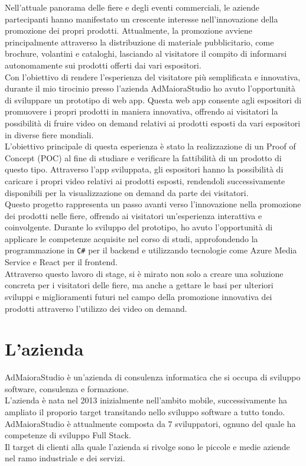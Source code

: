 Nell'attuale panorama delle fiere e degli eventi commerciali, le aziende partecipanti hanno manifestato un crescente interesse nell'innovazione della promozione 
dei propri prodotti. Attualmente, la promozione avviene principalmente attraverso la distribuzione di materiale pubblicitario, come brochure, volantini e cataloghi, 
lasciando al visitatore il compito di informarsi autonomamente sui prodotti offerti dai vari espositori.\\
Con l'obiettivo di rendere l'esperienza del visitatore più semplificata e innovativa, durante il mio tirocinio presso l'azienda AdMaioraStudio ho avuto 
l'opportunità di sviluppare un prototipo di web app. Questa web app consente agli espositori di promuovere i propri prodotti in maniera innovativa, 
offrendo ai visitatori la possibilità di fruire video on demand relativi ai prodotti esposti da vari espositori in diverse fiere mondiali.\\
L'obiettivo principale di questa esperienza è stato la realizzazione di un Proof of Concept (POC) al fine di studiare e verificare la fattibilità di 
un prodotto di questo tipo. Attraverso l'app sviluppata, gli espositori hanno la possibilità di caricare i propri video relativi ai prodotti esposti, 
rendendoli successivamente disponibili per la visualizzazione on demand da parte dei visitatori.\\
Questo progetto rappresenta un passo avanti verso l'innovazione nella promozione dei prodotti nelle fiere, offrendo ai visitatori un'esperienza interattiva 
e coinvolgente. Durante lo sviluppo del prototipo, ho avuto l'opportunità di applicare le competenze acquisite nel corso di studi, 
approfondendo la programmazione in \lstinline[language={[Sharp]C}]|C#| per il backend e utilizzando tecnologie come Azure Media Service e React per il frontend.\\
Attraverso questo lavoro di stage, si è mirato non solo a creare una soluzione concreta per i visitatori delle fiere, ma anche a gettare le basi per ulteriori 
sviluppi e miglioramenti futuri nel campo della promozione innovativa dei prodotti attraverso l'utilizzo dei video on demand.\\


\section{L'azienda}

AdMaioraStudio è un'azienda di consulenza informatica che si occupa di sviluppo software, consulenza e formazione.\\
L'azienda è nata nel 2013 inizialmente nell'ambito mobile, successivamente ha ampliato il proporio target transitando nello sviluppo software a tutto tondo.\\
AdMaioraStudio è attualmente composta da 7 sviluppatori, ognuno del quale ha competenze di sviluppo Full Stack.\\
Il target di clienti alla quale l'azienda si rivolge sono le piccole e medie aziende nel ramo industriale e dei servizi.\\

